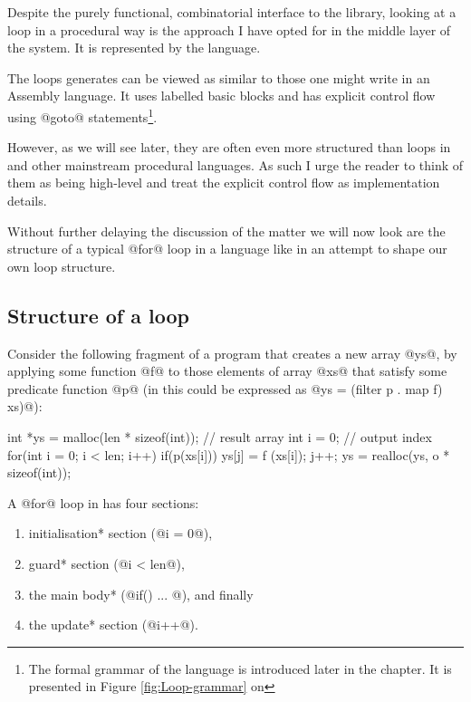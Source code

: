 \documentclass[preamble.tex]{subfiles}
\begin{document}
Despite the purely functional, combinatorial interface to the library, looking at a loop in a procedural way is the approach I have opted for in the middle layer of the system. It is represented by the \Loop language\iloop{}.

The loops \LiveFusion generates can be viewed as similar to those one might write in an Assembly language. It uses labelled basic blocks and has explicit control flow using @goto@ statements\footnote{The formal grammar of the \Loop language is introduced later in the chapter. It is presented in Figure \ref{fig:Loop-grammar} on \pageref{fig:Loop-grammar}}.

However, as we will see later, they are often even more structured than loops in \C and other mainstream procedural languages. As such I urge the reader to think of them as being high-level and treat the explicit control flow as implementation details.


Without further delaying the discussion of the matter we will now look are the structure of a typical @for@ loop in a language like \C in an attempt to shape our own loop structure.


\subsection{Structure of a  loop}

Consider the following fragment of a \C program that creates a new array @ys@, by applying some function @f@ to those elements of array @xs@ that satisfy some predicate function @p@ (in \Haskell this could be expressed as @ys = (filter p . map f) xs)@):

\begin{ccode}[numbers=left]
int *ys = malloc(len * sizeof(int)); // result array
int i = 0;                          // output index
for(int i = 0; i < len; i++) {
    if(p(xs[i])) {
        ys[j] = f (xs[i]);
        j++;
    }
}
ys = realloc(ys, o * sizeof(int));
\end{ccode}

A @for@ loop in \C has four sections:

\begin{enumerate}
\halfspacing
\item \*initialisation* section (@i = 0@),
\item \*guard* section (@i < len@),
\item the main \*body* (@if(){ $...$ }@), and finally
\item the \*update* section (@i++@).
\end{enumerate}
\end{document}
